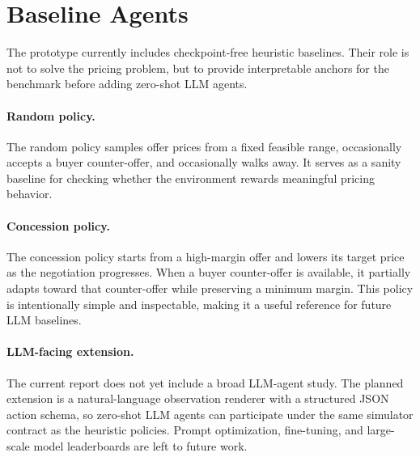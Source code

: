 \section{Baseline Agents}
\label{sec:agents}

The prototype currently includes checkpoint-free heuristic baselines. Their role is not to solve the pricing problem, but to provide interpretable anchors for the benchmark before adding zero-shot LLM agents.

\paragraph{Random policy.}
The random policy samples offer prices from a fixed feasible range, occasionally accepts a buyer counter-offer, and occasionally walks away. It serves as a sanity baseline for checking whether the environment rewards meaningful pricing behavior.

\paragraph{Concession policy.}
The concession policy starts from a high-margin offer and lowers its target price as the negotiation progresses. When a buyer counter-offer is available, it partially adapts toward that counter-offer while preserving a minimum margin. This policy is intentionally simple and inspectable, making it a useful reference for future LLM baselines.

\paragraph{LLM-facing extension.}
The current report does not yet include a broad LLM-agent study. The planned extension is a natural-language observation renderer with a structured JSON action schema, so zero-shot LLM agents can participate under the same simulator contract as the heuristic policies. Prompt optimization, fine-tuning, and large-scale model leaderboards are left to future work.
